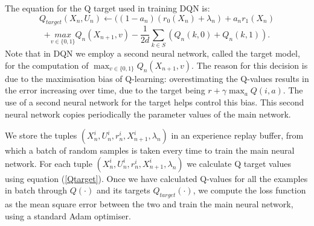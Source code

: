 \documentclass[12pt]{article}
\numberwithin{equation}{section}
\newcommand{\1}{\textbf{1}}
\begin{document}
The equation for the Q target used in training DQN is:
$$
    Q_{target}(X_n,U_n)\gets((1-a_n)(r_0(X_n)+\lambda_n)+a_nr_1(X_n)
$$    
\begin{equation}
\label{Qtarget}    
    +\underset{v\in\{0,1\}}{max}Q_n(X_{n+1},v)-\frac{1}{2d}\sum\limits_{k\in S}(Q_n(k,0)+Q_n(k,1)).
\end{equation}
Note that in DQN we employ a second neural network, called the target model, for the computation of $\max_{v\in\{0,1\}}Q_n(X_{n+1},v)$. 
The reason for this decision is due to the maximisation bias of Q-learning: overestimating the Q-values results in the error increasing  
over time, due to the target being $r + \gamma \max_a Q(i,a)$. The use of a second neural network for the target helps control this bias. 
This second neural network copies periodically the parameter values of the main network.

We store the tuples $(X_{n}^i,U_{n}^i,r_{n}^i,X_{n+1}^i,\lambda_n)$ in an experience replay buffer, from which a batch of random samples 
is taken every time to train the main neural network. For each tuple $(X_{n}^i,U_{n}^i,r_{n}^i,X_{n+1}^i,\lambda_n)$ we calculate Q target 
values using equation (\ref{Qtarget}). Once we have calculated Q-values for all the examples in batch through $Q(\cdot)$ and 
its targets $Q_{target}(\cdot)$, we compute the loss function as the mean square error between the two and train the main neural network, 
using a standard Adam optimiser.
\end{document}
